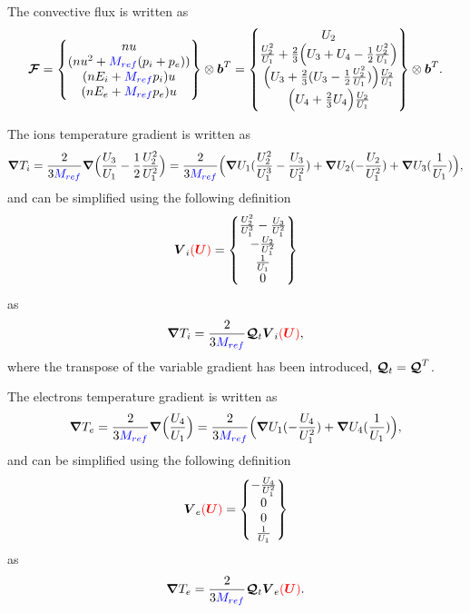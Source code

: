 \documentclass[a4paper,10pt]{article}
\newcommand{\bm}[1]{\text{\boldmath$#1$\unboldmath}}
\newcommand{\Grad}{\bm{\nabla}}
\renewcommand{\b}{\bm{b}}
\newcommand{\DiscFunc}[1]{\bm{#1}}
\newcommand{\SecOrdTens}[1]{\bm{\mathcal{#1}}}
\renewcommand{\u}{\DiscFunc{U}}
\newcommand{\F}{\SecOrdTens{F}}
\newcommand{\G}{\SecOrdTens{Q}}
\newcommand{\Gt}{\G_t}
\newcommand{\nd}[1]{{\color{blue} #1\color{black}}} %
\newcommand{\fo}[1]{{ \color{red} ( #1 )\color{black} }} %
\def\Mref{\nd{M_{ref}}}
\begin{document}
The convective flux is written as
\begin{equation*}
 \F = \begin{Bmatrix}
                     nu \\
                    (nu^2+ \Mref (p_i+p_e) ) \\
                    (nE_i+ \Mref p_i)u \\
                    (nE_e+ \Mref p_e)u
       \end{Bmatrix}\otimes \b^T = 
       \begin{Bmatrix}
                     U_2   \\
                   \frac{U_2^2}{U_1} +  \frac{2}{3}\Big(U_3+U_4-\frac{1}{2}\frac{U_2^2}{U_1}\Big) \\
                  \Big( U_3 +\frac{2}{3}(U_3-\frac{1}{2}\frac{U_2^2}{U_1})   \Big)\frac{U_2}{U_1}\\
                  \Big( U_4 +\frac{2}{3} U_4   \Big)\frac{U_2}{U_1}
       \end{Bmatrix}\otimes \b^T.
\end{equation*}


The ions temperature gradient is written as
\begin{equation*}
\Grad T_i = \frac{2}{3  \Mref }\Grad\Big(\frac{U_3}{U_1}- \frac{1}{2}\frac{U_2^2}{U_1^2} \Big) = 
 \frac{2}{3 \Mref }\Big( \Grad U_1 (\frac{U_2^2}{U_1^3}-\frac{U_3}{U_1^2}) + \Grad U_2 (-\frac{U_2}{U_1^2}) + \Grad U_3 (\frac{1}{U_1}) \Big), 
\end{equation*}
and can be simplified using the following definition 
\begin{equation}\label{eq:vi}
  \bm{V}_i\fo{\u} =\begin{Bmatrix}
             \frac{U_2^2}{U_1^3}-\frac{U_3}{U_1^2}\\
             -\frac{U_2}{U_1^2}\\
             \frac{1}{U_1}\\
             0
            \end{Bmatrix}
\end{equation}
as
\[
 \Grad T_i = \frac{2}{3 \Mref }\Gt  \bm{V}_i\fo{\u},
\]
where the transpose of the variable gradient has been introduced, $\Gt=\G^T$.

The electrons temperature gradient is written as
\begin{equation*}
\Grad T_e = \frac{2}{3  \Mref }\Grad\Big(\frac{U_4}{U_1}\Big) = 
 \frac{2}{3 \Mref }\Big( \Grad U_1 (-\frac{U_4}{U_1^2}) + \Grad U_4 (\frac{1}{U_1}) \Big), 
\end{equation*}
and can be simplified using the following definition 
\begin{equation}\label{eq:ve}
  \bm{V}_e\fo{\u} =\begin{Bmatrix}
             -\frac{U_4}{U_1^2}\\
                   0\\
                   0\\
             \frac{1}{U_1}
            \end{Bmatrix}
\end{equation}
as
\[
 \Grad T_e = \frac{2}{3 \Mref }\Gt  \bm{V}_e\fo{\u} .
\]
\end{document}
